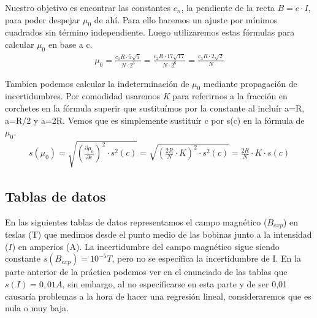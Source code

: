 \documentclass[12pt, a4paper, titlepage]{article}
\begin{document}
  Nuestro objetivo es encontrar las constantes $c_n$, la pendiente de la recta $B = c \cdot I$, para poder despejar $\mu_0$ de ahí. Para ello haremos un ajuste por mínimos cuadrados sin término independiente. Luego utilizaremos estas fórmulas para calcular $\mu_0$ en base a c.
  \begin{gather}
    \mu_0 = \frac{c_1 R \cdot 5 \sqrt{5}}{N \cdot 2^3} = \frac{c_2 R \cdot 17 \sqrt{17}}{N \cdot 2^6} = \frac{c_3 R \cdot 2 \sqrt{2}}{N} \label{ec:mu}
  \end{gather}

  Tambien podemos calcular la indeterminación de $\mu_0$ mediante propagación de incertidumbres. Por comodidad usaremos \textit{K} para referirnos a la fracción en corchetes en la fórmula superir que sustituímos por la constante al incluír a=R, a=R/2 y a=2R. Vemos que es simplemente sustituír c por s(c) en la fórmula de $\mu_0$.
  \begin{gather}
    s(\mu_0) = \sqrt{\left(\frac{\partial \mu_0}{\partial c} \right)^2 \cdot s^2(c)} = \sqrt{\left( \frac{2R}{N} \cdot K \right)^2 \cdot s^2(c)} = \frac{2R}{N} \cdot K \cdot s(c) \label{ec:smu}
  \end{gather}

  \newpage
  \subsection{Tablas de datos}

  En las siguientes tablas de datos representamos el campo magnético ($B_{exp}$) en teslas (T) que medimos desde el punto medio de las bobinas junto a la intensidad ($I$) en amperios (A). La incertidumbre del campo magnético sigue siendo constante $s(B_{exp}) = 10^{-5}T$, pero no se especifica la incertidumbre de I. En la parte anterior de la práctica podemos ver en el enunciado de las tablas que $s(I) = 0,01A$, sin embargo, al no especificarse en esta parte y de ser 0,01 causaría problemas a la hora de hacer una regresión lineal, consideraremos que es nula o muy baja.
\end{document}
